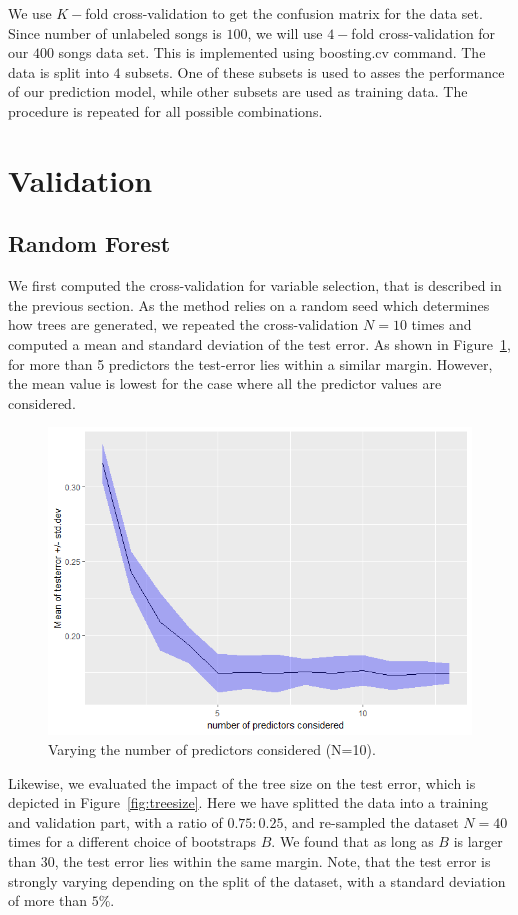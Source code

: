 \documentclass{article}
\begin{document}
We use $K-$fold cross-validation to get the confusion matrix for the data set. Since number of unlabeled songs is $100$, we will use $4-$fold cross-validation for our $400$ songs data set. This is implemented using {\selectfont boosting.cv} command. The data is split into $4$ subsets. One of these subsets is used to asses the performance of our prediction model, while other subsets are used as training data. The procedure is repeated for all possible combinations.

\section{Validation}

\subsection{Random Forest}

We first computed the cross-validation for variable selection, that is described in the previous section.
As the method relies on a random seed which determines how trees are generated, we repeated the cross-validation $N=10$ times and computed a mean and standard deviation of the test error.
As shown in Figure~\ref{fig:numpredictors}, for more than 5 predictors the test-error lies within a similar margin.
However, the mean value is lowest for the case where all the predictor values are considered.

\begin{figure}[htp!]
  \centering
  \includegraphics[height=0.5\textwidth] {figs/numpredictors.png}
  \caption{Varying the number of predictors considered (N=10).}
  \label{fig:numpredictors}
\end{figure}

Likewise, we evaluated the impact of the tree size on the test error, which is depicted in Figure~\ref{fig:treesize}.
Here we have splitted the data into a training and validation part, with a ratio of $0.75:0.25$, and re-sampled the dataset $N=40$ times for a different choice of bootstraps $B$.
We found that as long as $B$ is larger than 30, the test error lies within the same margin.
Note, that the test error is strongly varying depending on the split of the dataset, with a standard deviation of more than $5\%$.
\end{document}
